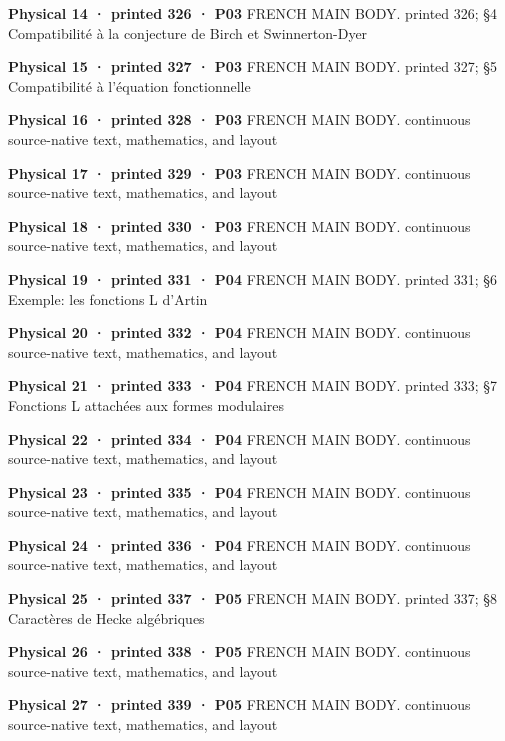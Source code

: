 \documentclass[10pt,twoside]{article}
\begin{document}
\noindent\textbf{Physical 14 · printed 326 · P03} \textsf{FRENCH MAIN BODY}. printed 326; \S{}4 Compatibilité à la conjecture de Birch et Swinnerton-Dyer\par\smallskip
\noindent\textbf{Physical 15 · printed 327 · P03} \textsf{FRENCH MAIN BODY}. printed 327; \S{}5 Compatibilité à l’équation fonctionnelle\par\smallskip
\noindent\textbf{Physical 16 · printed 328 · P03} \textsf{FRENCH MAIN BODY}. continuous source-native text, mathematics, and layout\par\smallskip
\noindent\textbf{Physical 17 · printed 329 · P03} \textsf{FRENCH MAIN BODY}. continuous source-native text, mathematics, and layout\par\smallskip
\noindent\textbf{Physical 18 · printed 330 · P03} \textsf{FRENCH MAIN BODY}. continuous source-native text, mathematics, and layout\par\smallskip
\noindent\textbf{Physical 19 · printed 331 · P04} \textsf{FRENCH MAIN BODY}. printed 331; \S{}6 Exemple: les fonctions L d’Artin\par\smallskip
\noindent\textbf{Physical 20 · printed 332 · P04} \textsf{FRENCH MAIN BODY}. continuous source-native text, mathematics, and layout\par\smallskip
\noindent\textbf{Physical 21 · printed 333 · P04} \textsf{FRENCH MAIN BODY}. printed 333; \S{}7 Fonctions L attachées aux formes modulaires\par\smallskip
\noindent\textbf{Physical 22 · printed 334 · P04} \textsf{FRENCH MAIN BODY}. continuous source-native text, mathematics, and layout\par\smallskip
\noindent\textbf{Physical 23 · printed 335 · P04} \textsf{FRENCH MAIN BODY}. continuous source-native text, mathematics, and layout\par\smallskip
\noindent\textbf{Physical 24 · printed 336 · P04} \textsf{FRENCH MAIN BODY}. continuous source-native text, mathematics, and layout\par\smallskip
\noindent\textbf{Physical 25 · printed 337 · P05} \textsf{FRENCH MAIN BODY}. printed 337; \S{}8 Caractères de Hecke algébriques\par\smallskip
\noindent\textbf{Physical 26 · printed 338 · P05} \textsf{FRENCH MAIN BODY}. continuous source-native text, mathematics, and layout\par\smallskip
\noindent\textbf{Physical 27 · printed 339 · P05} \textsf{FRENCH MAIN BODY}. continuous source-native text, mathematics, and layout\par\smallskip
\end{document}
